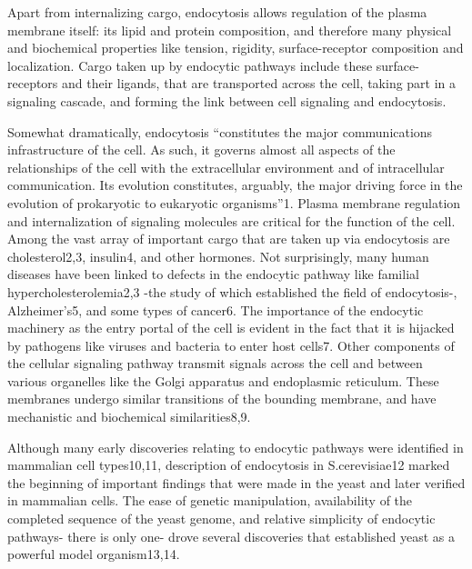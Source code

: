 Apart from internalizing cargo, endocytosis allows regulation of the plasma membrane itself: its lipid and protein composition, and therefore many physical and biochemical properties like tension, rigidity, surface-receptor composition and localization. Cargo taken up by endocytic pathways include these surface-receptors and their ligands, that are transported across the cell, taking part in a signaling cascade, and forming the link between cell signaling and endocytosis.


\vspace{5mm}
Somewhat dramatically, endocytosis “constitutes the major communications infrastructure of the cell. As such, it governs almost all aspects of the relationships of the cell with the extracellular environment and of intracellular communication. Its evolution constitutes, arguably, the major driving force in the evolution of prokaryotic to eukaryotic organisms”1.  Plasma membrane regulation and internalization of signaling molecules are critical for the function of the cell. Among the vast array of important cargo that are taken up via endocytosis are cholesterol2,3, insulin4, and other hormones. Not surprisingly, many human diseases have been linked to defects in the endocytic pathway like familial hypercholesterolemia2,3 -the study of which established the field of endocytosis-, Alzheimer’s5, and some types of cancer6. The importance of the endocytic machinery as the entry portal of the cell is evident in the fact that it is hijacked by pathogens like viruses and bacteria to enter host cells7. Other components of the cellular signaling pathway transmit signals across the cell and between various organelles like the Golgi apparatus and endoplasmic reticulum. These membranes undergo similar transitions of the bounding membrane, and have mechanistic and biochemical similarities8,9. 




Although many early discoveries relating to endocytic pathways were identified in mammalian cell types10,11, description of endocytosis in S.cerevisiae12 marked the beginning of important findings that were made in the yeast and later verified in mammalian cells. The ease of genetic manipulation, availability of the completed sequence of the yeast genome, and relative simplicity of endocytic pathways- there is only one- drove several discoveries that established yeast as a powerful model organism13,14.



